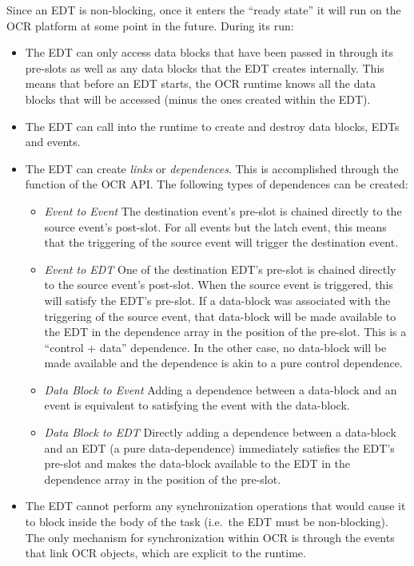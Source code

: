 Since an EDT is non-blocking, once it
enters the ``ready state'' it will run on the OCR platform at some point in the
future. During its run:
\begin{itemize}
\item The EDT can only access data blocks that have been passed in
through its pre-slots as well as any data blocks that the EDT creates
internally. This means that before an EDT starts, the OCR runtime
knows all the data blocks that will be accessed (minus the ones
created within the EDT).

\item The EDT can call into the runtime to create and destroy data
blocks, EDTs and events.

\item The EDT can create \emph{links} or \emph{dependences}. This is
accomplished through the  function of the OCR
API. The following types of dependences can be created:
\begin{itemize}
\item \emph{Event to Event} The destination event’s pre-slot is chained
directly to the source event’s post-slot.
For all events but the latch event, this means that the triggering of
the source event will trigger the destination event.

\item \emph{Event to EDT} One of the destination EDT’s pre-slot is chained
directly to the source event’s post-slot. When the source event is
triggered, this will satisfy the EDT’s pre-slot. If a data-block was
associated with the triggering of the source event, that data-block
will be made available to the EDT in the dependence array in the
position of the pre-slot. This is a “control + data” dependence. In
the other case, no data-block will be made available and the
dependence is akin to a pure control dependence.

\item \emph{Data Block to Event} Adding a dependence between a data-block and an
event is equivalent to satisfying the event with the data-block.

\item \emph{Data Block to EDT} Directly adding a dependence between a data-block and
an EDT (a pure data-dependence) immediately satisfies the EDT’s
pre-slot and makes the data-block available to the EDT in the
dependence array in the position of the pre-slot.

\end{itemize}

\item The EDT cannot perform any synchronization operations that would
cause it to block inside the body of the task (i.e.\ the EDT must be
non-blocking). The only mechanism for synchronization within OCR is
through the events that link OCR objects, which are explicit to the
runtime.

\end{itemize}


